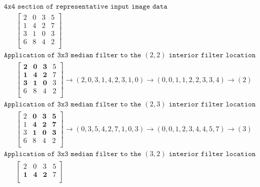 \documentclass[11pt,fleqn]{article}
\begin{document}
\begin{figure}[!ht]
\small
\begin{mdframed}
\begin{equation*}
\begin{aligned}
&\texttt{4x4 section of representative input image data}\\
& \hspace{20pt} \begin{bmatrix}
2 & 0 & 3 & 5 \\
1 & 4 & 2 & 7 \\
3 & 1 & 0 & 3 \\
6 & 8 & 4 & 2 \\ 
\end{bmatrix} \\[10pt]
%
& \texttt{Application of 3x3 median filter to the $(2,2)$ interior filter location}\\
& \hspace{20pt} \begin{bmatrix}
\mathbf{2} & \mathbf{0} & \mathbf{3} & 5 \\
\mathbf{1} & \mathbf{4} & \mathbf{2} & 7 \\
\mathbf{3} & \mathbf{1} & \mathbf{0} & 3 \\
6 & 8 & 4 & 2 \\ 
\end{bmatrix} 
\rightarrow (2, 0, 3, 1, 4, 2, 3, 1, 0) \rightarrow (0, 0, 1, 1, 2, 2, 3, 3, 4) \rightarrow (2) \\[10pt]
%
& \texttt{Application of 3x3 median filter to the $(2,3)$ interior filter location}\\
& \hspace{20pt} \begin{bmatrix}
2 & \mathbf{0} & \mathbf{3} & \mathbf{5} \\
1 & \mathbf{4} & \mathbf{2} & \mathbf{7} \\
3 & \mathbf{1} & \mathbf{0} & \mathbf{3} \\
6 & 8 & 4 & 2 \\ 
\end{bmatrix} 
\rightarrow (0, 3, 5, 4, 2, 7, 1, 0, 3) \rightarrow (0, 0, 1, 2, 3, 4, 4, 5, 7) \rightarrow (3) \\[10pt]
%
& \texttt{Application of 3x3 median filter to the $(3,2)$ interior filter location}\\
& \hspace{20pt} \begin{bmatrix}
2 & 0 & 3 & 5 \\
\mathbf{1} & \mathbf{4} & \mathbf{2} & 7 \\

\end{bmatrix}
\end{aligned}
\end{equation*}
\end{mdframed}
\end{figure}
\end{document}
